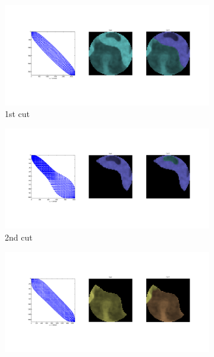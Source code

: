 \documentclass{article}
\begin{document}
    \begin{figure}[h]
      \centering
      \begin{subfigure}[t]{0.45\linewidth}
        \centering
        \includegraphics[width=\linewidth,trim={5cm 2.5cm 5cm 1cm},clip]{imgs/minvar1}
        \vspace{-1cm}
        \caption*{1st cut}
      \end{subfigure}
      \hfill
      \begin{subfigure}[t]{0.45\linewidth}
        \centering
        \includegraphics[width=\linewidth,trim={5cm 2.5cm 5cm 1cm},clip]{imgs/minvar2}
        \vspace{-1cm}
        \caption*{2nd cut}
      \end{subfigure}
      \vspace{-1cm}
      \begin{subfigure}[t]{0.45\linewidth}
        \centering
        \includegraphics[width=\linewidth,trim={5cm 2.5cm 5cm 1cm},clip]{imgs/minvar3}

\end{subfigure}
\end{figure}
\end{document}
